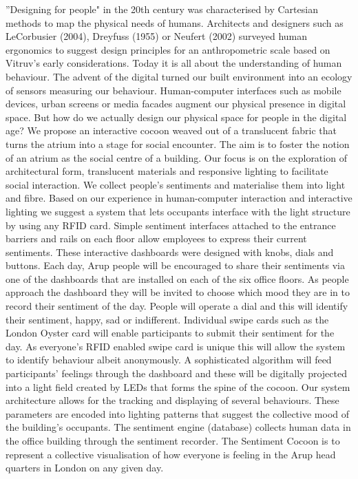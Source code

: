 ''Designing for people" in the 20th century was characterised by Cartesian methods to map the physical needs of humans. Architects and designers such as LeCorbusier (2004), Dreyfuss (1955) or Neufert (2002) surveyed human ergonomics to suggest design principles for an anthropometric scale based on Vitruv’s early considerations. Today it is all about the understanding of human behaviour. The advent of the digital turned our built environment into an ecology of sensors measuring our behaviour. Human-computer interfaces such as mobile devices, urban screens or media facades augment our physical presence in digital space. But how do we actually design our physical space for people in the digital age?
We propose an interactive cocoon weaved out of a translucent fabric that turns the atrium into a stage for social encounter. The aim is to foster the notion of an atrium as the social centre of a building. Our focus is on the exploration of architectural form, translucent materials and responsive lighting to facilitate social interaction. We collect people’s sentiments and materialise them into light and fibre.
Based on our experience in human-computer interaction and interactive lighting we suggest a system that lets occupants interface with the light structure by using any RFID card. Simple sentiment interfaces attached to the entrance barriers and rails on each floor allow employees to express their current sentiments. These interactive dashboards were designed with knobs, dials and buttons. Each day, Arup people will be encouraged to share their sentiments via one of the dashboards that are installed on each of the six office floors. As people approach the dashboard they will be invited to choose which mood they are in to record their sentiment of the day. People will operate a dial and this will identify their sentiment, happy, sad or indifferent. Individual swipe cards such as the London Oyster card will enable participants to submit their sentiment for the day. As everyone’s RFID enabled swipe card is unique this will allow the system to identify behaviour albeit anonymously. A sophisticated algorithm will feed participants’ feelings through the dashboard and these will be digitally projected into a light field created by LEDs that forms the spine of the cocoon.
Our system architecture allows for the tracking and displaying of several behaviours. These parameters are encoded into lighting patterns that suggest the collective mood of the building’s occupants. The sentiment engine (database) collects human data in the office building through the sentiment recorder. The Sentiment Cocoon is to represent a collective visualisation of how everyone is feeling in the Arup head quarters in London on any given day. 
